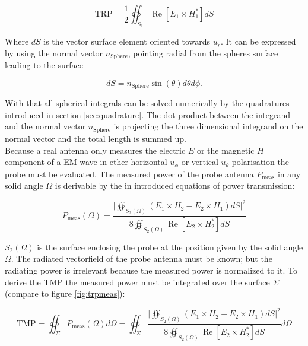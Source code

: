 \begin{equation}
\text{TRP}=\frac{1}{2}  \oiint_{S_1} \operatorname{Re}\left[E_1	\times H_1^*\right]dS
\end{equation}

Where $dS$ is the vector surface element oriented towards $u_r$. It can be expressed by using the normal vector $n_\text{Sphere}$, pointing radial from the spheres surface leading to the surface 

\begin{equation}
dS = n_\text{Sphere}\sin\left(\theta\right) d\theta d\phi.
\end{equation}

With that all spherical integrals can be solved numerically by the quadratures introduced in section \ref{sec:quadrature}. The dot product between the integrand and the normal vector $n_\text{Sphere}$ is projecting the three dimensional integrand on the normal vector and the total length is summed up.\\
Because a real antenna only measures the electric $E$ or the magnetic $H$ component of a \ac{EM} wave in ether horizontal $u_\phi$ or vertical $u_\theta$ polarisation the probe must be evaluated. The measured power of the probe antenna $P_\text{meas}$ in any solid angle $\Omega$ is derivable by the in \cite{book} introduced equations of power transmission:

\begin{equation}
P_\text{meas}\left(\Omega\right) = \frac{\big|\oiint_{S_2\left(\Omega\right)}\left(E_1\times H_2 - E_2\times H_1\right)dS\big|^2}{8\oiint_{S_2\left(\Omega\right)}\operatorname{Re}\left[E_2\times H_2^*\right]dS}
\end{equation}

$S_2\left(\Omega\right)$  is the surface enclosing the probe at the position given by the solid angle $\Omega$. The radiated vectorfield of the probe antenna must be known; but the radiating power is irrelevant because the measured power is normalized to it. To derive the \ac{TMP} the measured power must be integrated over the surface $\Sigma$ (compare to figure \ref{fig:trpmeas}): \cite{mypaper}

\begin{equation}
\text{TMP}=\oiint_\Sigma P_\text{meas}\left(\Omega\right)d\Omega = \oiint_\Sigma \frac{\big|\oiint_{S_2\left(\Omega\right)}\left(E_1\times H_2 - E_2\times H_1\right)dS\big|^2}{8\oiint_{S_2\left(\Omega\right)}\operatorname{Re}\left[E_2\times H_2^*\right]dS} d\Omega
\label{eq:trpint}
\end{equation}  

